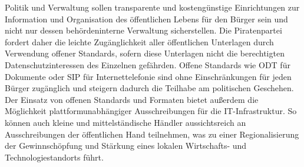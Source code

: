   Politik und Verwaltung sollen transparente und kostengünstige Einrichtungen 
  zur Information und Organisation des öffentlichen Lebens für den Bürger sein 
  und nicht nur dessen behördeninterne Verwaltung sicherstellen. Die 
  Piratenpartei fordert daher die leichte Zugänglichkeit aller öffentlichen 
  Unterlagen durch Verwendung offener Standards, sofern diese Unterlagen nicht 
  die berechtigten Datenschutzinteressen des Einzelnen gefährden. Offene 
  Standards wie ODT für Dokumente oder SIP für Internettelefonie sind ohne 
  Einschränkungen für jeden Bürger zugänglich und steigern dadurch die 
  Teilhabe am politischen Geschehen. Der Einsatz von offenen Standards und 
  Formaten bietet außerdem die Möglichkeit plattformunabhängiger 
  Ausschreibungen für die IT-Infrastruktur. So können auch kleine und 
  mittelständische Händler aussichtsreich an Ausschreibungen der öffentlichen 
  Hand teilnehmen, was zu einer Regionalisierung der Gewinnschöpfung und 
  Stärkung eines lokalen Wirtschafts- und Technologiestandorts führt.
